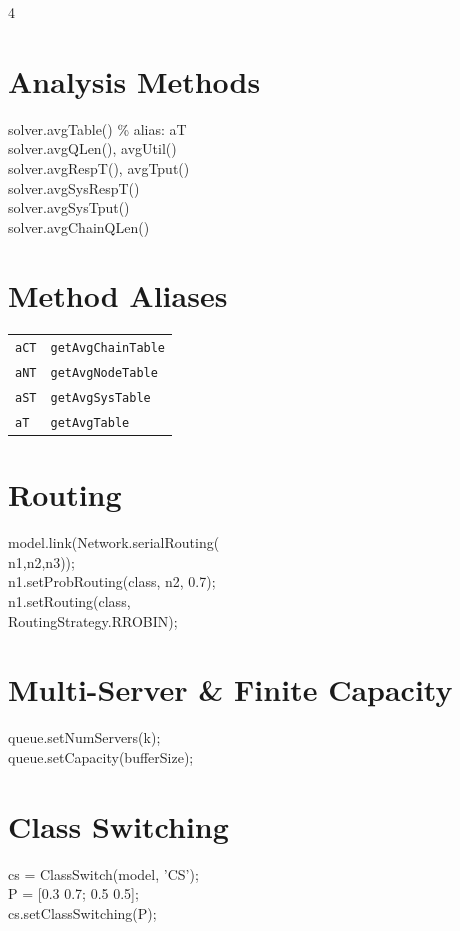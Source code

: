 \documentclass[9pt,landscape,a4paper]{extarticle}
\begin{document}
\begin{multicols}{4}
\section*{Analysis Methods}
\begin{codebox}
solver.avgTable()  \% alias: aT\\
solver.avgQLen(), avgUtil()\\
solver.avgRespT(), avgTput()\\
solver.avgSysRespT()\\
solver.avgSysTput()\\
solver.avgChainQLen()
\end{codebox}

\section*{Method Aliases}
\begin{tabular}{@{}ll@{}}
\texttt{aCT} & \texttt{getAvgChainTable} \\
\texttt{aNT} & \texttt{getAvgNodeTable} \\
\texttt{aST} & \texttt{getAvgSysTable} \\
\texttt{aT} & \texttt{getAvgTable} \\
\end{tabular}

\section*{Routing}
\begin{codebox}
model.link(Network.serialRouting(\\
\quad n1,n2,n3));\\
n1.setProbRouting(class, n2, 0.7);\\
n1.setRouting(class,\\
\quad RoutingStrategy.RROBIN);
\end{codebox}

\section*{Multi-Server \& Finite Capacity}
\begin{codebox}
queue.setNumServers(k);\\
queue.setCapacity(bufferSize);
\end{codebox}

\section*{Class Switching}
\begin{codebox}
cs = ClassSwitch(model, 'CS');\\
P = [0.3 0.7; 0.5 0.5];\\
cs.setClassSwitching(P);
\end{codebox}


\end{multicols}
\end{document}
